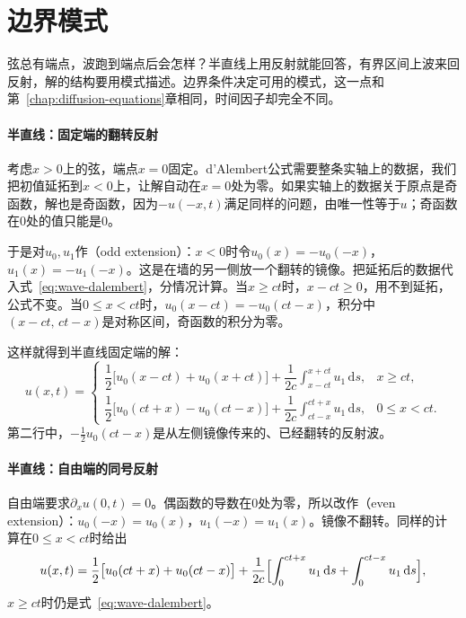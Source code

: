 \section{边界模式}
\label{sec:wave-modes}

弦总有端点，波跑到端点后会怎样？半直线上用反射就能回答，有界区间上波来回反射，解的结构要用模式描述。边界条件决定可用的模式，这一点和第~\ref{chap:diffusion-equations}章相同，时间因子却完全不同。

\paragraph{半直线：固定端的翻转反射}
考虑$x>0$上的弦，端点$x=0$固定。d'Alembert公式需要整条实轴上的数据，我们把初值延拓到$x<0$上，让解自动在$x=0$处为零。如果实轴上的数据关于原点是奇函数，解也是奇函数，因为$-u(-x,t)$满足同样的问题，由唯一性等于$u$；奇函数在$0$处的值只能是$0$。

于是对$u_0,u_1$作（odd extension）：$x<0$时令$u_0(x)=-u_0(-x)$，$u_1(x)=-u_1(-x)$。这是在墙的另一侧放一个翻转的镜像。把延拓后的数据代入式~\eqref{eq:wave-dalembert}，分情况计算。当$x\geq ct$时，$x-ct\geq0$，用不到延拓，公式不变。当$0\leq x<ct$时，$u_0(x-ct)=-u_0(ct-x)$，积分中$(x-ct,\,ct-x)$是对称区间，奇函数的积分为零。

这样就得到半直线固定端的解：
\begin{equation}
 u(x,t)=
 \begin{cases}
  \dfrac12\bigl[u_0(x-ct)+u_0(x+ct)\bigr]+\dfrac1{2c}\displaystyle\int_{x-ct}^{x+ct}u_1\,\mathrm{d}s, & x\geq ct,\\
  \dfrac12\bigl[u_0(ct+x)-u_0(ct-x)\bigr]+\dfrac1{2c}\displaystyle\int_{ct-x}^{ct+x}u_1\,\mathrm{d}s, & 0\leq x<ct .
 \end{cases}
 \label{eq:wave-halfline-fixed}
\end{equation}
第二行中，$-\frac12u_0(ct-x)$是从左侧镜像传来的、已经翻转的反射波。

\paragraph{半直线：自由端的同号反射}
自由端要求$\partial_xu(0,t)=0$。偶函数的导数在$0$处为零，所以改作（even extension）：$u_0(-x)=u_0(x)$，$u_1(-x)=u_1(x)$。镜像不翻转。同样的计算在$0\leq x<ct$时给出
\begin{equation}
 u(x,t)=\frac12\bigl[u_0(ct+x)+u_0(ct-x)\bigr]+\frac1{2c}\Bigl[\int_0^{ct+x}u_1\,\mathrm{d}s+\int_0^{ct-x}u_1\,\mathrm{d}s\Bigr],
 \label{eq:wave-halfline-free}
\end{equation}
$x\geq ct$时仍是式~\eqref{eq:wave-dalembert}。

